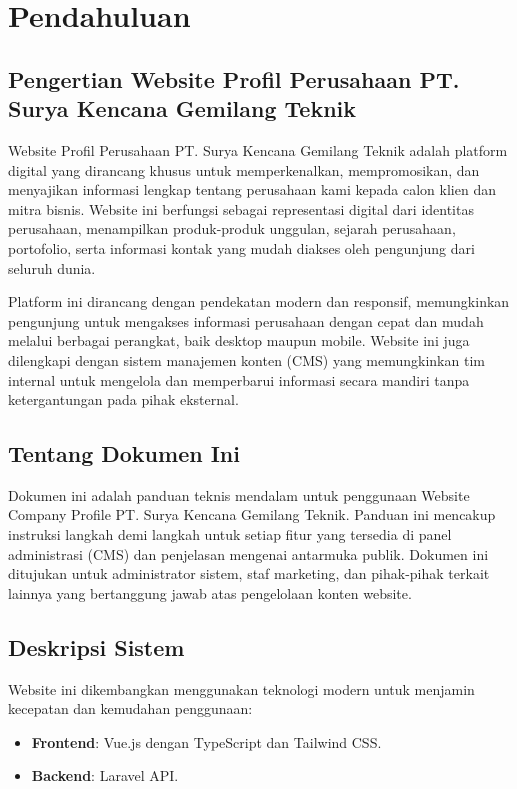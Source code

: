 \documentclass[12pt,a4paper]{report}
\begin{document}
\chapter{Pendahuluan}

\section{Pengertian Website Profil Perusahaan PT. Surya Kencana Gemilang Teknik}
Website Profil Perusahaan PT. Surya Kencana Gemilang Teknik adalah platform digital yang dirancang khusus untuk memperkenalkan, mempromosikan, dan menyajikan informasi lengkap tentang perusahaan kami kepada calon klien dan mitra bisnis. Website ini berfungsi sebagai representasi digital dari identitas perusahaan, menampilkan produk-produk unggulan, sejarah perusahaan, portofolio, serta informasi kontak yang mudah diakses oleh pengunjung dari seluruh dunia.

Platform ini dirancang dengan pendekatan modern dan responsif, memungkinkan pengunjung untuk mengakses informasi perusahaan dengan cepat dan mudah melalui berbagai perangkat, baik desktop maupun mobile. Website ini juga dilengkapi dengan sistem manajemen konten (CMS) yang memungkinkan tim internal untuk mengelola dan memperbarui informasi secara mandiri tanpa ketergantungan pada pihak eksternal.

\section{Tentang Dokumen Ini}
Dokumen ini adalah panduan teknis mendalam untuk penggunaan Website Company Profile PT. Surya Kencana Gemilang Teknik. Panduan ini mencakup instruksi langkah demi langkah untuk setiap fitur yang tersedia di panel administrasi (CMS) dan penjelasan mengenai antarmuka publik. Dokumen ini ditujukan untuk administrator sistem, staf marketing, dan pihak-pihak terkait lainnya yang bertanggung jawab atas pengelolaan konten website.

\section{Deskripsi Sistem}
Website ini dikembangkan menggunakan teknologi modern untuk menjamin kecepatan dan kemudahan penggunaan:
\begin{itemize}
    \item \textbf{Frontend}: Vue.js dengan TypeScript dan Tailwind CSS.
    \item \textbf{Backend}: Laravel API.
\end{itemize}
\end{document}
